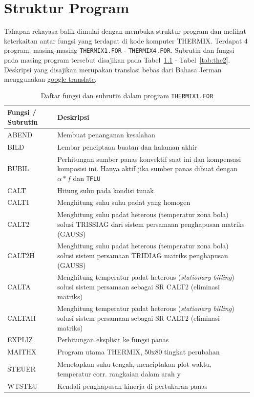 \documentclass[a4paper,11pt]{report}
\renewcommand{\tablename}{Tabel}
\begin{document}
\chapter{Struktur Program}
Tahapan rekayasa balik dimulai dengan membuka struktur program dan melihat keterkaitan antar fungsi yang terdapat di kode komputer THERMIX. Terdapat 4 program, masing-masing \texttt{THERMIX1.FOR} - \texttt{THERMIX4.FOR}. Subrutin dan fungsi pada masing program tersebut disajikan pada \tablename~\ref{tab:the1} - \tablename~\ref{tab:the2}. Deskripsi yang disajikan merupakan translasi bebas dari Bahasa Jerman menggunakan \href{https://translate.google.com/}{google translate}.

\begin{table}[h!]
  \caption{Daftar fungsi dan subrutin dalam program \texttt{THERMIX1.FOR}}
  \label{tab:the1}

  \begin{center}
    \begin{tabular}{p{3cm}|p{10cm}}
    \toprule
       Fungsi / Subrutin & Deskripsi\\ \midrule
       ABEND & Membuat penanganan kesalahan \\
       BILD & Lembar penciptaan buatan dan halaman akhir \\
       BUBIL & Perhitungan sumber panas konvektif saat ini dan kompensasi komposisi ini. Hanya aktif jika sumber panas dibuat dengan $\alpha * f$ dan \texttt{TFLU} \\
       CALT & Hitung suhu pada kondisi tunak \\
       CALT1 & Menghitung suhu suhu padat yang homogen \\
       CALT2 & Menghitung suhu padat heterous (temperatur zona bola) solusi TRISSIAG dari sistem persamaan penghapusan matriks (GAUSS) \\
       CALT2H & Menghitung suhu padat heterous (temperatur zona bola) solusi sistem persamaan TRIDIAG matriks penghapusan (GAUSS) \\
       CALTA & Menghitung temperatur padat heterous (\textit{stationary billing}) solusi sistem persamaan sebagai SR CALT2 (eliminasi matriks) \\
       CALTAH & Menghitung temperatur padat heterous (\textit{stationary billing}) solusi sistem persamaan sebagai SR CALT2 (eliminasi matriks) \\
       EXPLIZ & Perhitungan eksplisit ke fungsi panas \\
       MAITHX & Program utama THERMIX, 50x80 tingkat perubahan \\
       STEUER & Menetapkan suhu tengah, menciptakan plot waktu, temperatur corr. rangkaian dalam arah y \\ 
       WTSTEU & Kendali penghapusan kinerja di pertukaran panas \\
       \bottomrule
    \end{tabular}
  \end{center}
\end{table}
\end{document}
